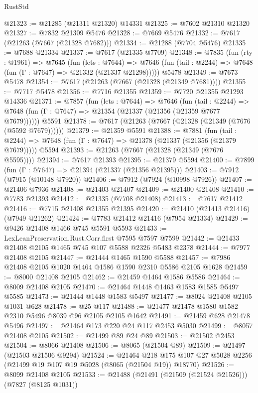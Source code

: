 \begin{lexlean}{RustStd}
\begin{coremodule}
@21323 := @21285 (@21311 @21320) @14331
@21325 := @7602 @21310 @21320
@21327 := @7832 @21309 @5476
@21328 := @7669 @5476
@21332 := @7617 (@21263 (@7667 (@21328 @7682)))
@21334 := @21288 (@7704 @5476)
@21335 := @7688 @21334
@21337 := @7617 (@21335 @7709)
@21348 := @7835
    (fun (rty : @1961) =>
    @7645
      (fun (lets : @7644) =>
      @7646 (fun (tail : @2244) => @7648 (fun (Γ : @7647) => @21332 (@21337 @21298)))))
    @5478
@21349 := @7673 @5478
@21354 := @7617 (@21263 (@7667 (@21328 (@21349 @7681))))
@21355 := @7717 @5478
@21356 := @7716 @21355
@21359 := @7720 @21355 @21293 @14336
@21371 := @7857
    (fun (lets : @7644) =>
    @7646
      (fun (tail : @2244) =>
      @7648 (fun (Γ : @7647) => @21354 (@21337 (@21356 (@21359 @7677 @7679))))))
    @5591
@21378 := @7617 (@21263 (@7667 (@21328 (@21349 (@7676 (@5592 @7679))))))
@21379 := @21359 @5591
@21388 := @7881
    (fun (tail : @2244) => @7648 (fun (Γ : @7647) => @21378 (@21337 (@21356 (@21379 @7679)))))
    @5594
@21393 := @21263 (@7667 (@21328 (@21349 (@7676 @5595))))
@21394 := @7617 @21393
@21395 := @21379 @5594
@21400 := @7899 (fun (Γ : @7647) => @21394 (@21337 (@21356 @21395)))
@21403 := @7912 (@7915 (@10148 @7920))
@21406 := @7912 (@7924 (@10998 @7926))
@21407 := @21406 @7936
@21408 := @21403 @21407
@21409 := @21400 @21408
@21410 := @7783 @21393
@21412 := @21335 (@7708 @21408)
@21413 := @7617 @21412
@21416 := @7715 @21408 @21355 @21395
@21420 := @21410 (@21413 @21416) (@7949 @21262)
@21424 := @7783 @21412 @21416 (@7954 @21334)
@21429 := @9426 @21408 @1466 @745 @5591 @5593
@21433 := LexLeanPreservation.Rust.Corr.first @7595 @7597 @7599
@21442 := @21433 @21408 @2105 @1465 @745 @107 @5588 @2326 @5483 @2378
@21444 := @7977 @21408 @2105
@21447 := @21444 @1465 @1590 @5588
@21457 := @7986 @21408 @2105 @1020 @1464 @1586 @1590 @2310 @5586 @2105 @1628
@21459 := @8000 @21408 @2105
@21462 := @21459 @1464 @1586 @5586
@21464 := @8009 @21408 @2105
@21470 := @21464 @1448 @1463 @1583 @1585 @5497 @5585
@21473 := @21444 @1448 @1583 @5497
@21477 := @8024 @21408 @2105 @1031 @628
@21478 := @25 @117
@21488 := @21477 @21478 @1580 @1582 @2310 @5496 @8039 @96 @2105 @2105 @1642
@21491 := @21459 @628 @21478 @5496
@21497 := @21464 @173 @220 @24 @117 @2453 @5030
@21499 := @8057 @21408 @2105
@21502 := @21499 @89 @24 @89
@21503 := @21502 @2453
@21504 := @8066 @21408
@21506 := @8065 (@21504 @89)
@21509 := @21497 (@21503 @21506 @9294)
@21524 := @21464
    @218
    @175
    @107
    @27
    @5028
    @2256
    (@21499 @19 @107 @19 @5028 (@8065 (@21504 @19)) @18770)
@21526 := @8099 @21408 @2105
@21533 := @21488 (@21491 (@21509 (@21524 @21526))) (@7827 (@8125 @1031))

\end{coremodule}
\end{lexlean}
